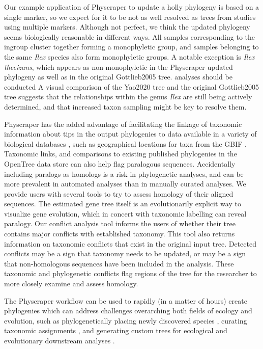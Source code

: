 \documentclass{bmcart}
\begin{document}
Our example application of Physcraper to update a holly phylogeny is based on a
single marker, so we expect for it to be not as well resolved as trees from studies
using multiple markers. Although not perfect,
we think the updated phylogeny seems biologically reasonable in different ways. All samples
corresponding to the ingroup cluster together forming a monophyletic group, and
samples belonging to the same \textit{Ilex} species also form
monophyletic groups. A notable exception is \textit{Ilex theeizans}, which appears as
non-monophyletic in the Physcraper updated phylogeny as well as in the original Gottlieb2005 tree.
analyses should be conducted
A visual comparison of the Yao2020 tree and the original Gottlieb2005 tree suggests
that the relationships within the genus \textit{Ilex} are still being actively
determined, and that increased taxon sampling might be key to resolve them.

Physcraper has the added advantage of facilitating the linkage of taxonomic information about tips
in the output phylogenies to data available in a variety of biological databases
\cite{rees2017automated}, such as
geographical locations for taxa from the GBIF \cite{gbif_secretariat_gbif_2019}.
Taxonomic links, and comparisons to existing published phylogenies in the OpenTree
data store can also help flag paralogous sequences.
Accidentally including paralogs as homologs is a risk in phylogenetic analyses,
and can be more prevalent in automated analyses than in manually curated analyses.
We provide users with several tools to try to assess homology of their aligned sequences.
The estimated gene tree itself is an evolutionarily explicit way to visualize gene
evolution, which in concert with taxonomic labelling can reveal paralogy.
Our conflict analysis tool informs the users of whether their tree contains major
conflicts with established taxonomy.
This tool also returns information on taxonomic conflicts that exist
in the original input tree.
Detected conflicts may be a sign that taxonomy needs to be updated, or may be a sign
that non-homologous sequences have been included in the analysis.
These taxonomic and phylogenetic conflicts flag regions of the tree for the researcher
to more closely examine and assess homology.

The Physcraper workflow can be used to rapidly (in a matter of hours) create
phylogenies which can address challenges overarching both fields of ecology and evolution, such as
phylogenetically placing newly discovered species \cite{webb2010biodiversity},
curating taxonomic assignments
\cite{san2010molecular},
and generating custom trees for ecological \cite{helmus2012phylogenetic} and
evolutionary downstream analyses \cite{stoltzfus2013phylotastic}.
\end{document}

